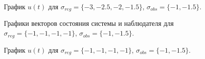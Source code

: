 \begin{figure}[!h]
	\caption{График $u(t)$ для $\sigma_{reg} = \{ -3, -2.5, -2, -1.5\}$, $\sigma_{obs}= \{-1, -1.5 \}$.}
	\label{3_u_k1l1}
\end{figure}

\begin{figure}[!h]
	\caption{Графики векторов состояния системы и наблюдателя для $\sigma_{reg} = \{ -1, -1, -1, -1\}$, $\sigma_{obs}= \{-1, -1.5 \}$.}
	\label{3_x_k2l1}
\end{figure}

\begin{figure}[!h]
	\caption{График $u(t)$ для $\sigma_{reg} = \{ -1, -1, -1, -1\}$, $\sigma_{obs}= \{-1, -1.5 \}$.}
	\label{3_u_k2l1}
\end{figure}


